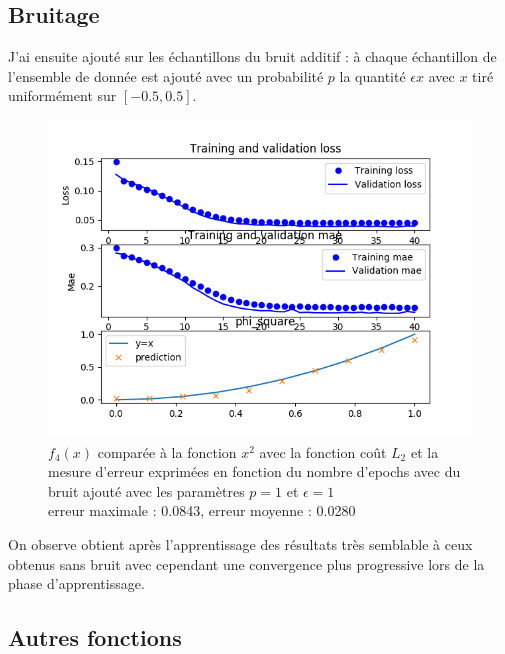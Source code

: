\documentclass[a4paper,11pt,twoside]{report}
\begin{document}
	\subsection{Bruitage}
	J'ai ensuite ajouté sur les échantillons du bruit additif : à chaque échantillon de l'ensemble de donnée est ajouté avec un probabilité $p$ la quantité $\epsilon x$ avec $x$ tiré uniformément sur $[-0.5,0.5]$. 
	 \begin{figure}[H]
	 	\begin{center}
	 		\includegraphics[width=0.7\linewidth]{bruit.png}
	 		\caption{$f_4(x)$ comparée à la fonction $x^2$  avec la fonction coût $L_2$ et la mesure d'erreur exprimées en fonction du nombre d'epochs avec du bruit ajouté avec les paramètres $p=1$ et $\epsilon=1$\\erreur maximale : 0.0843, erreur moyenne : 0.0280}
	 	\end{center}
	 \end{figure}
	On observe obtient après l'apprentissage des résultats très semblable à ceux obtenus sans bruit avec cependant une convergence plus progressive lors de la phase d'apprentissage.
	\subsection{Autres fonctions}
\end{document}

